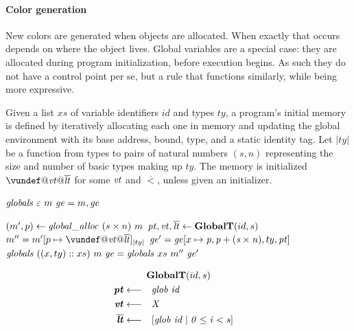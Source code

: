 \documentclass{article}
\begin{document}
\paragraph*{Color generation}

New colors are generated when objects are allocated. When exactly that occurs
depends on where the object lives. Global variables are a special case: they are
allocated during program initialization, before execution begins. As such they
do not have a control point per se, but a rule that functions similarly, while
being more expressive.


Given a list \(xs\) of variable identifiers \(id\) and types
\(ty\), a program's initial memory is defined by iteratively allocating each one
in memory and updating the global environment with its base address, bound, type,
and a static identity tag. Let \(|ty|\) be a function from types
to pairs of natural numbers \((s,n)\) representing the size and number of
basic types making up \(ty\).
The memory is initialized \(\vundef@\vt@\overline{\lt}\)
for some \(\mathit{vt}\) and \(\overline{\lt}\), unless given an initializer.


\judgment{}
         {\(\mathit{globals} ~ \varepsilon ~ m ~ \mathit{ge} = m,\mathit{ge}\)}

                   {\((m',p) \leftarrow \mathit{global\_alloc} ~ (s \times n) ~ m\)}
                   {\(\mathit{pt},\mathit{vt},\overline{\mathit{lt}} \leftarrow \mathbf{GlobalT}(id,s)\)}
                   {\(\mem'' = \mem'[p \mapsto \vundef@\vt@\overline{\lt}]_{|ty|}\)}
                   {\(\mathit{ge}' = \mathit{ge}[x \mapsto \mathit{p,p+(s \times n)},ty,\mathit{pt}]\)}
                   {\(\mathit{globals} ~ ((x,ty)::xs) ~ m ~ \mathit{ge} = \mathit{globals} ~ xs ~ m'' ~ \mathit{ge}'\)}

\[\begin{aligned}
\truledef{\globalt{id}{s}}
\settag{\pt}{\mathit{glob ~ id}}
\settag{\vt}{X}
\settag{\overline{\lt}}{\left[\mathit{glob} ~ id \mid 0 \leq i < s\right]}
\end{aligned}\]
\end{document}
